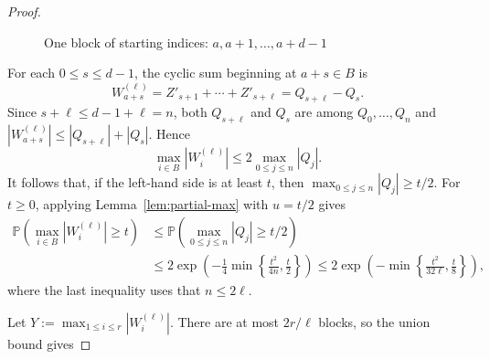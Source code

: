 \documentclass[12pt,a4paper]{article}
\numberwithin{equation}{section}
\theoremstyle{definition}
\theoremstyle{remark}
\begin{document}
\begin{proof}
\begin{figure}[htbp]
\caption{One block of starting indices: $a,a+1,\ldots,a+d-1$}
\label{fig:cyclic-block}
\end{figure}




For each $0\le s\le d-1$, the cyclic sum beginning at $a+s\in B$ is
\[
W_{a+s}^{(\ell)}=Z'_{s+1}+\cdots+Z'_{s+\ell}=Q_{s+\ell}-Q_s.
\]
Since $s+\ell\le d-1+\ell=n$, both  $Q_{s+\ell}$ and $Q_s$ are among
$Q_0,\ldots,Q_n$ and 
$|W_{a+s}^{(\ell)}|\le |Q_{s+\ell}|+|Q_s|$. Hence
$$ \max_{i\in B}|W_i^{(\ell)}|
 \le2\max_{0\le j\le n}|Q_j|.$$
It follows that, if the left-hand side is at least $t$, then
$\max_{0\le j\le n}|Q_j|\ge t/2$.  
For $t\ge0$, applying Lemma~\ref{lem:partial-max} with $u=t/2$ gives
\begin{align*}
   \mathbb{P}\left(\max_{i\in B}|W_i^{(\ell)}|\ge t\right)&\le 
   \mathbb{P}\left(\max_{0\le j\le n}|Q_j|
   \ge t/2\right)\\
    &
 \le2\exp\left(-\frac14\min\left\{\frac{t^2}{4n},\frac t2\right\}\right)
 \le2\exp\left(-\min\left\{\frac{t^2}{32\ell},\frac{t}8\right\}\right),
\end{align*}
 where the last inequality uses that $n\le 2\ell$.

Let $Y:=\max_{1\le i\le r}|W_i^{(\ell)}|$.  There are at most $2r/\ell$ blocks, so the union bound gives


\end{proof}
\end{document}
